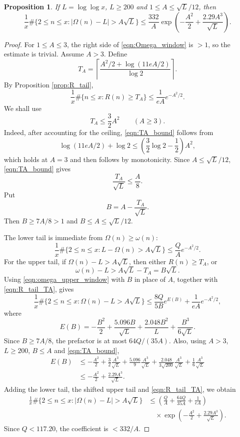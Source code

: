 \documentclass[12pt,a4paper,reqno]{amsart}
\theoremstyle{plain}
\newtheorem{prpstn}[thrm]{Proposition}
\numberwithin{sblmm}{thrm}
\numberwithin{equation}{section}
\begin{document}
\begin{prpstn}\label{prop:gaussian_Omega}
    If $L=\log\log x$, $L\ge 200$ and $1\le A\le\sqrt{L}/12$, then
    \begin{equation}\label{eqn:Omega_window}
        \frac{1}{x}\#\{2\le n\le x:|\Omega(n)-L|>A\sqrt{L}\}\le\frac{332}{A}\exp\left(-\frac{A^2}{2}+\frac{2.29A^3}{\sqrt{L}}\right).
    \end{equation}
\end{prpstn}
\begin{proof}
    For $1\le A\le 3$, the right side of \eqref{eqn:Omega_window} is $>1$, so the estimate is trivial. Assume $A>3$. Define
    $$T_A=\left\lceil\frac{A^2/2+\log(11eA/2)}{\log 2}\right\rceil.$$
    By Proposition \ref{prop:R_tail},
    \begin{equation}\label{eqn:R_tail_TA}
        \frac{1}{x}\#\{n\le x:R(n)\ge T_A\}\le\frac{1}{eA}e^{-A^2/2}.
    \end{equation}
    We shall use
    \begin{equation}\label{eqn:TA_bound}
        T_A\le\frac{3}{2}A^2\qquad (A\ge 3).
    \end{equation}
    Indeed, after accounting for the ceiling, \eqref{eqn:TA_bound} follows from
    $$\log(11eA/2)+\log 2\le\left(\frac{3}{2}\log 2-\frac{1}{2}\right)A^2,$$
    which holds at $A=3$ and then follows by monotonicity. Since $A\le\sqrt{L}/12$, \eqref{eqn:TA_bound} gives
    $$\frac{T_A}{\sqrt{L}}\le\frac{A}{8}.$$
    Put
    $$B=A-\frac{T_A}{\sqrt{L}}.$$
    Then $B\ge 7A/8>1$ and $B\le A\le\sqrt{L}/12$.

    The lower tail is immediate from $\Omega(n)\ge\omega(n)$:
    $$\frac{1}{x}\#\{2\le n\le x:L-\Omega(n)>A\sqrt{L}\}\le\frac{Q}{A}e^{-A^2/2}.$$
    For the upper tail, if $\Omega(n)-L>A\sqrt{L}$, then either $R(n)\ge T_A$, or
    $$\omega(n)-L>A\sqrt{L}-T_A=B\sqrt{L}.$$
    Using \eqref{eqn:omega_upper_window} with $B$ in place of $A$, together with \eqref{eqn:R_tail_TA}, gives
    $$\frac{1}{x}\#\{2\le n\le x:\Omega(n)-L>A\sqrt{L}\}\le\frac{8Q}{5B}e^{E(B)}+\frac{1}{eA}e^{-A^2/2},$$
    where
    $$E(B)=-\frac{B^2}{2}+\frac{5.096B}{\sqrt{L}}+\frac{2.048B^2}{L}+\frac{B^3}{6\sqrt{L}}.$$
    Since $B\ge 7A/8$, the prefactor is at most $64Q/(35A)$. Also, using $A>3$, $L\ge 200$, $B\le A$ and \eqref{eqn:TA_bound},
    \begin{align*}
        E(B)&\le -\frac{A^2}{2}+\frac{3}{2}\frac{A^3}{\sqrt{L}}+\frac{5.096}{9}\frac{A^3}{\sqrt{L}}+\frac{2.048}{3\sqrt{200}}\frac{A^3}{\sqrt{L}}+\frac{1}{6}\frac{A^3}{\sqrt{L}}\\
        &\le -\frac{A^2}{2}+\frac{2.29A^3}{\sqrt{L}}.
    \end{align*}
    Adding the lower tail, the shifted upper tail and \eqref{eqn:R_tail_TA}, we obtain
    \begin{align*}
        \frac{1}{x}\#\{2\le n\le x:|\Omega(n)-L|>A\sqrt{L}\}&\le\left(\frac{Q}{A}+\frac{64Q}{35A}+\frac{1}{eA}\right)\\
        &\quad\times\exp\left(-\frac{A^2}{2}+\frac{2.29A^3}{\sqrt{L}}\right).
    \end{align*}
    Since $Q<117.20$, the coefficient is $<332/A$.
\end{proof}
\end{document}
